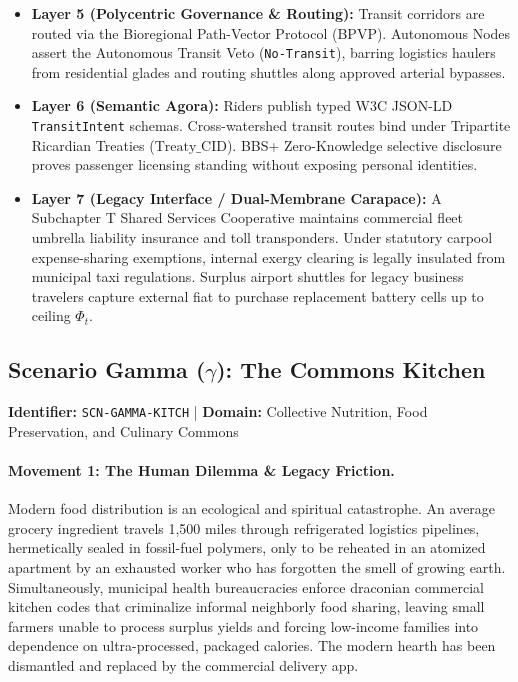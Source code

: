 \begin{itemize}
    \item \textbf{Layer 5 (Polycentric Governance \& Routing):} Transit corridors are routed via the Bioregional Path-Vector Protocol (BPVP). Autonomous Nodes assert the Autonomous Transit Veto (\texttt{No-Transit}), barring logistics haulers from residential glades and routing shuttles along approved arterial bypasses.
    \item \textbf{Layer 6 (Semantic Agora):} Riders publish typed W3C JSON-LD \texttt{TransitIntent} schemas. Cross-watershed transit routes bind under Tripartite Ricardian Treaties ($\mathrm{Treaty\_CID}$). BBS+ Zero-Knowledge selective disclosure proves passenger licensing standing without exposing personal identities.
    \item \textbf{Layer 7 (Legacy Interface / Dual-Membrane Carapace):} A Subchapter T Shared Services Cooperative maintains commercial fleet umbrella liability insurance and toll transponders. Under statutory carpool expense-sharing exemptions, internal exergy clearing is legally insulated from municipal taxi regulations. Surplus airport shuttles for legacy business travelers capture external fiat to purchase replacement battery cells up to ceiling $\Phi_t$.
\end{itemize}

\subsection{Scenario Gamma (\texorpdfstring{$\gamma$}{Gamma}): The Commons Kitchen}
\label{subsec:scn_gamma}
\textbf{Identifier:} \texttt{SCN-GAMMA-KITCH} \quad | \quad \textbf{Domain:} Collective Nutrition, Food Preservation, and Culinary Commons

\paragraph{Movement 1: The Human Dilemma \& Legacy Friction.}
Modern food distribution is an ecological and spiritual catastrophe. An average grocery ingredient travels 1,500 miles through refrigerated logistics pipelines, hermetically sealed in fossil-fuel polymers, only to be reheated in an atomized apartment by an exhausted worker who has forgotten the smell of growing earth. Simultaneously, municipal health bureaucracies enforce draconian commercial kitchen codes that criminalize informal neighborly food sharing, leaving small farmers unable to process surplus yields and forcing low-income families into dependence on ultra-processed, packaged calories. The modern hearth has been dismantled and replaced by the commercial delivery app.

